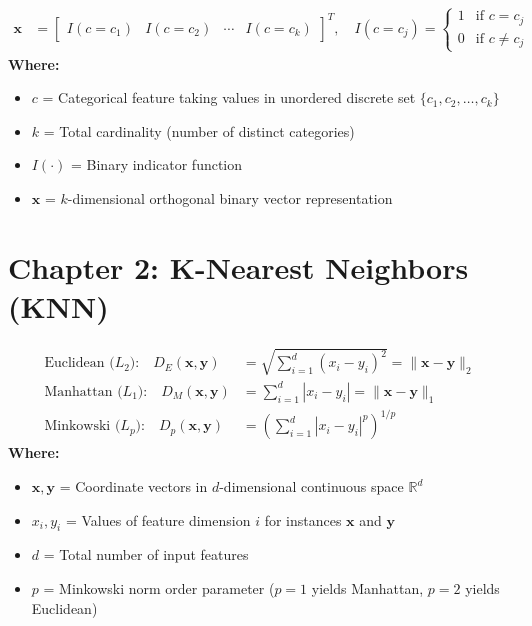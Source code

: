 \begin{formulabox}
\begin{align*}
    \mathbf{x} &= \begin{bmatrix} I(c = c_1) & I(c = c_2) & \cdots & I(c = c_k) \end{bmatrix}^T, \quad I(c = c_j) = \begin{cases} 1 & \text{if } c = c_j \\ 0 & \text{if } c \ne c_j \end{cases}
\end{align*}
\textbf{Where:}
\begin{itemize}[noitemsep, topsep=1pt]
    \item $c$ = Categorical feature taking values in unordered discrete set $\{c_1, c_2, \dots, c_k\}$
    \item $k$ = Total cardinality (number of distinct categories)
    \item $I(\cdot)$ = Binary indicator function
    \item $\mathbf{x}$ = $k$-dimensional orthogonal binary vector representation
\end{itemize}
\end{formulabox}

\section*{Chapter 2: K-Nearest Neighbors (KNN)}

\begin{formulabox}
\begin{align*}
    \text{Euclidean ($L_2$):} \quad D_E(\mathbf{x}, \mathbf{y}) &= \sqrt{\sum_{i=1}^d (x_i - y_i)^2} = \|\mathbf{x} - \mathbf{y}\|_2 \\[2pt]
    \text{Manhattan ($L_1$):} \quad D_M(\mathbf{x}, \mathbf{y}) &= \sum_{i=1}^d |x_i - y_i| = \|\mathbf{x} - \mathbf{y}\|_1 \\[2pt]
    \text{Minkowski ($L_p$):} \quad D_p(\mathbf{x}, \mathbf{y}) &= \left(\sum_{i=1}^d |x_i - y_i|^p\right)^{1/p}
\end{align*}
\textbf{Where:}
\begin{itemize}[noitemsep, topsep=1pt]
    \item $\mathbf{x}, \mathbf{y}$ = Coordinate vectors in $d$-dimensional continuous space $\mathbb{R}^d$
    \item $x_i, y_i$ = Values of feature dimension $i$ for instances $\mathbf{x}$ and $\mathbf{y}$
    \item $d$ = Total number of input features
    \item $p$ = Minkowski norm order parameter ($p=1$ yields Manhattan, $p=2$ yields Euclidean)
\end{itemize}
\end{formulabox}


